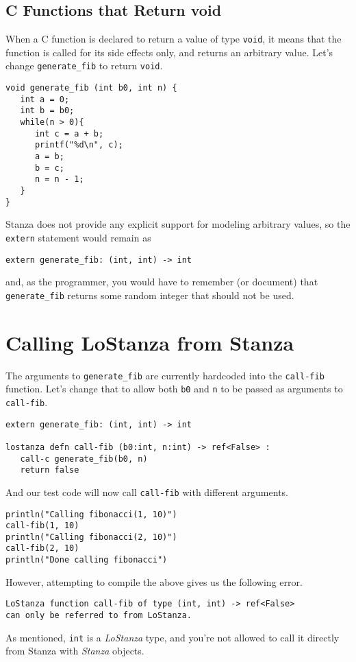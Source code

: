 \documentclass[10pt,oneside]{book}
\begin{document}
\subsection*{C Functions that Return void}
When a C function is declared to return a value of type \texttt{\frenchspacing void}, it means that the function is called for its side effects only, and returns an arbitrary value. Let's change \texttt{\frenchspacing generate\_fib} to return \texttt{\frenchspacing void}.
\begin{lstlisting}
void generate_fib (int b0, int n) {
   int a = 0;
   int b = b0;
   while(n > 0){
      int c = a + b;
      printf("%d\n", c);
      a = b;
      b = c;
      n = n - 1;
   }
}
\end{lstlisting}

Stanza does not provide any explicit support for modeling arbitrary values, so the \texttt{\frenchspacing extern} statement would remain as
\begin{lstlisting}
extern generate_fib: (int, int) -> int
\end{lstlisting}
and, as the programmer, you would have to remember (or document) that \texttt{\frenchspacing generate\_fib} returns some random integer that should not be used.

\section{Calling LoStanza from Stanza}
The arguments to \texttt{\frenchspacing generate\_fib} are currently hardcoded into the \texttt{\frenchspacing call-fib} function. Let's change that to allow both \texttt{\frenchspacing b0} and \texttt{\frenchspacing n} to be passed as arguments to \texttt{\frenchspacing call-fib}.
\begin{lstlisting}
extern generate_fib: (int, int) -> int

lostanza defn call-fib (b0:int, n:int) -> ref<False> :
   call-c generate_fib(b0, n)
   return false
\end{lstlisting}
And our test code will now call \texttt{\frenchspacing call-fib} with different arguments.
\begin{lstlisting}
println("Calling fibonacci(1, 10)")
call-fib(1, 10)
println("Calling fibonacci(2, 10)")
call-fib(2, 10)
println("Done calling fibonacci")
\end{lstlisting}

However, attempting to compile the above gives us the following error.
\begin{lstlisting}
LoStanza function call-fib of type (int, int) -> ref<False> 
can only be referred to from LoStanza.
\end{lstlisting}
As mentioned, \texttt{\frenchspacing int} is a {\em LoStanza} type, and you're not allowed to call it directly from Stanza with {\em Stanza} objects.
\end{document}
